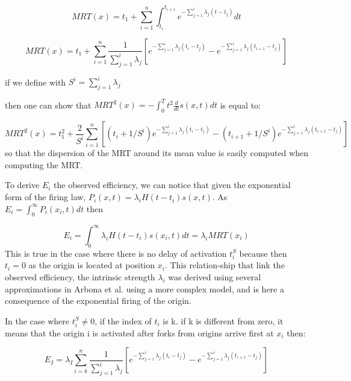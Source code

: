 \documentclass[10pt,a4paper]{revtex4-2}
\begin{document}
\begin{equation}
MRT(x) = t_1+ \sum_{i=1}^{n}\int_{t_i}^{t_{i+1}}e^{-\sum_{j=1}^i \lambda_j(t-t_j)}dt
\end{equation}

\begin{equation}\label{app:mrt_exp}
MRT(x) = t_1 +\sum_{i=1}^{n}\frac{1}{\sum_{j=1}^i \lambda_j}\left[e^{-\sum_{j=1}^i \lambda_j(t_i-t_j)}  -e^{-\sum_{j=1}^i \lambda_j(t_{i+1}-t_j)} \right]
\end{equation}


if we define with $S^i=\sum_{j=1}^i \lambda_j$

then one can show that $MRT^2(x)=- \int_{0}^{T} t^2 \frac{ d }{dt} s(x,t) dt$ is equal to:

\begin{equation}\label{app:mrt_exp2}
MRT^2(x) = t^2_1 +\frac{2}{S^i} \sum_{i=1}^{n} \left[(t_i+1/S^i)e^{-\sum_{j=1}^i \lambda_j(t_i-t_j)}  -(t_{i+1}+1/S^i)e^{-\sum_{j=1}^i \lambda_j(t_{i+1}-t_j)} \right]
\end{equation}
so that the dispersion of the MRT around its mean value is easily computed when computing the MRT.


To derive $E_i$ the observed efficiency, we can notice that given the exponential form of the firing law, $P_i(x,t)=\lambda_i H(t-t_i)s(x,t)$. As $E_i = \int_0^{\infty}P_i(x_i,t)dt$ then

\begin{equation}\label{Ei}
E_i = \int_0^{\infty} \lambda_i H(t-t_i) s(x_i,t)dt = \lambda_i MRT(x_i)
\end{equation}
This is true in the case where there is no delay of activation $t_i^S$ because then $t_i=0$ as the origin is located at position $x_i$.
This relation-ship that link the observed efficiency, the intrinsic strength $\lambda_i$ was derived using several approximations in Arbona et al. \cite{Arbona2023} using a more complex model, and is here a consequence of the exponential firing of the origin.

In the case where $t_i^S \neq 0$, if the index of $t_i$ is k. if k is different from zero, it means that the origin i is activated after forks from origins arrive first at $x_i$ then:

\begin{equation}
E_I = \lambda_I \sum_{i=k}^{n}\frac{1}{\sum_{j=1}^i \lambda_j}\left[e^{-\sum_{j=1}^i \lambda_j(t_i-t_j)}  -e^{-\sum_{j=1}^i \lambda_j(t_{i+1}-t_j)} \right]
\end{equation}
\end{document}
